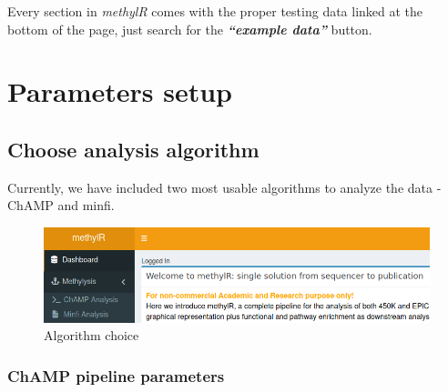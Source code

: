\documentclass[
  a4paper,
  oneside,
  open=any]{scrreport}
\begin{document}
Every section in \emph{methylR} comes with the proper testing data
linked at the bottom of the page, just search for the
\textbf{\emph{``example data''}} button.

\hypertarget{parameters-setup}{%
\section{Parameters setup}\label{parameters-setup}}

\hypertarget{choose-analysis-algorithm}{%
\subsection{Choose analysis algorithm}\label{choose-analysis-algorithm}}

Currently, we have included two most usable algorithms to analyze the
data - ChAMP and minfi.\\

\begin{figure}[H]

{\centering \includegraphics{./_images/methylysis_01.png}

}

\caption{Algorithm choice}

\end{figure}

\hypertarget{champ-pipeline-parameters}{%
\subsubsection{\texorpdfstring{\textbf{ChAMP pipeline
parameters}}{ChAMP pipeline parameters}}\label{champ-pipeline-parameters}}
\end{document}
